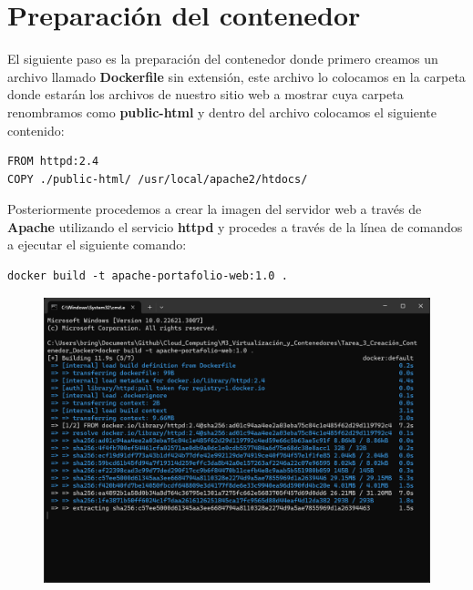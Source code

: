 \documentclass[12pt,a4paper]{article}
\begin{document}
\section{Preparación del contenedor}

El siguiente paso es la preparación del contenedor donde primero creamos un archivo llamado \textbf{Dockerfile} sin extensión, este archivo lo colocamos en la carpeta donde estarán los archivos de nuestro sitio web a mostrar cuya carpeta renombramos como \textbf{public-html} y dentro del archivo colocamos el siguiente contenido:

\begin{lstlisting}[]
FROM httpd:2.4
COPY ./public-html/ /usr/local/apache2/htdocs/
\end{lstlisting}

Posteriormente procedemos a crear la imagen del servidor web a través de \textbf{Apache} utilizando el servicio \textbf{httpd} y procedes a través de la línea de comandos a ejecutar el siguiente comando:

\begin{lstlisting}[]
docker build -t apache-portafolio-web:1.0 .
\end{lstlisting}


\begin{figure}[H]
    \centering
    \includegraphics[width=1\linewidth]{M3_Virtualización_y_Contenedores/Tarea_3_Creación_Contenedor_Docker/reporte/figuras/3-1_Preparación_del_Contenedor.png}
    \label{fig:Preparación_Contenedor_1}
\end{figure}
\end{document}
